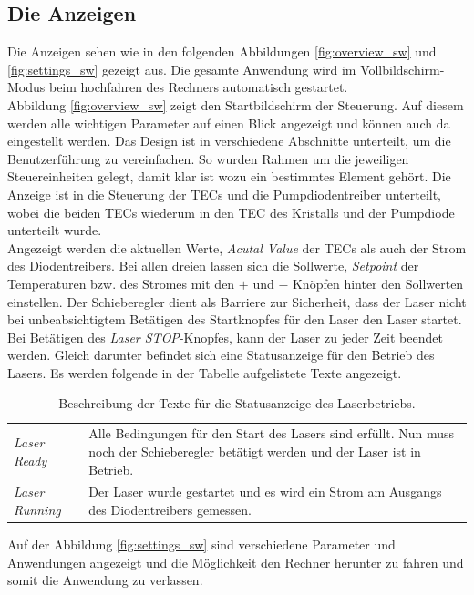 \subsection{Die Anzeigen}
Die Anzeigen sehen wie in den folgenden Abbildungen \ref{fig:overview_sw} und \ref{fig:settings_sw} gezeigt aus. Die gesamte Anwendung wird im Vollbildschirm-Modus beim hochfahren          des Rechners automatisch gestartet.\\
Abbildung \ref{fig:overview_sw} zeigt den Startbildschirm der Steuerung. Auf diesem werden alle wichtigen Parameter auf einen Blick angezeigt und können auch da eingestellt werden. Das Design ist in verschiedene Abschnitte unterteilt, um die Benutzerführung zu vereinfachen. So wurden Rahmen um die jeweiligen Steuereinheiten gelegt, damit klar ist wozu ein bestimmtes Element gehört. Die Anzeige ist in die Steuerung der TECs und die Pumpdiodentreiber unterteilt, wobei die beiden TECs wiederum in den TEC des Kristalls und der Pumpdiode unterteilt wurde.\\
Angezeigt werden die aktuellen Werte, \textit{Acutal Value} der TECs als auch der Strom des Diodentreibers. Bei allen dreien lassen sich die Sollwerte, \textit{Setpoint} der Temperaturen bzw. des Stromes mit den $+$ und $-$ Knöpfen hinter den Sollwerten einstellen.
Der Schieberegler dient als Barriere zur Sicherheit, dass der Laser nicht bei unbeabsichtigtem Betätigen des Startknopfes für den Laser den Laser startet. Bei Betätigen des \textit{Laser STOP}-Knopfes, kann der Laser zu jeder Zeit beendet werden.
Gleich darunter befindet sich eine Statusanzeige für den Betrieb des Lasers. Es werden folgende in der Tabelle aufgelistete Texte angezeigt.

\begin{table}[H]
    \centering
    \begin{tabular}{l|l}
         \textit{Laser Ready}&  Alle Bedingungen für den Start des Lasers sind erfüllt. Nun muss noch der Schieberegler betätigt werden und der Laser ist in Betrieb.\\
         \textit{Laser Running}&    Der Laser wurde gestartet und es wird ein Strom am Ausgangs des Diodentreibers gemessen.
    \end{tabular}
    \caption{Beschreibung der Texte für die Statusanzeige des Laserbetriebs.}
    \label{tab:my_label}
\end{table}
Auf der Abbildung \ref{fig:settings_sw} sind verschiedene Parameter und Anwendungen angezeigt und die Möglichkeit den Rechner herunter zu fahren und somit die Anwendung zu verlassen.

